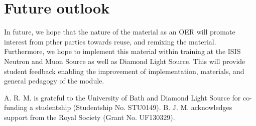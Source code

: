 \documentclass[amsmath,amssymb,twocolumn,superscriptaddress]{revtex4-1}
\begin{document}
\section{Future outlook}

In future, we hope that the nature of the material as an OER will promate interest from pther parties towards reuse, and remixing the material.
Furthermore, we hope to implement this material within training at the ISIS Neutron and Muon Source as well as Diamond Light Source.
This will provide student feedback enabling the improvement of implementation, materials, and general pedagogy of the module.

\begin{acknowledgements}
A. R. M. is grateful to the University of Bath and Diamond Light Source for co-funding a studentship (Studentship No. STU0149).
B. J. M. acknowledges support from the Royal Society (Grant No. UF130329).
\end{acknowledgements}


\end{document}
